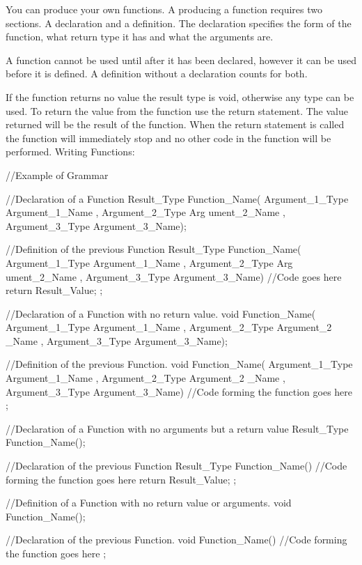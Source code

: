 You can produce your own functions. A producing a function requires two sections. A declaration and a definition. The declaration specifies the form of the function, what return type it has and what the arguments are. \par
 A function cannot be used until after it has been declared, however it can be used before it is defined. A definition without a declaration counts for both. \par
 If the function returns no value the result type is void, otherwise any type can be used. To return the value from the function use the return statement. The value returned will be the result of the function. When the return statement is called the function will immediately stop and no other code in the function will be performed. Writing Functions: 
\begin{DoxyCode}
 //Example of Grammar

 //Declaration of a Function
 Result_Type Function_Name( Argument_1_Type Argument_1_Name , Argument_2_Type Arg
      ument_2_Name , Argument_3_Type Argument_3_Name);

 //Definition of the previous Function
 Result_Type Function_Name( Argument_1_Type Argument_1_Name , Argument_2_Type Arg
      ument_2_Name , Argument_3_Type Argument_3_Name)
 {
 //Code goes here
 return Result_Value;
 };

 //Declaration of a Function with no return value.
 void Function_Name( Argument_1_Type Argument_1_Name , Argument_2_Type Argument_2
      _Name , Argument_3_Type Argument_3_Name);

 //Definition of the previous Function.
 void Function_Name( Argument_1_Type Argument_1_Name , Argument_2_Type Argument_2
      _Name , Argument_3_Type Argument_3_Name)
 {
 //Code forming the function goes here
 };

 //Declaration of a Function with no arguments but a return value
 Result_Type Function_Name();

 //Declaration of the previous Function
 Result_Type Function_Name()
 {
  //Code forming the function goes here
 return Result_Value;
 };

 //Definition of a Function with no return value or arguments.
 void Function_Name();

 //Declaration of the previous Function.
 void Function_Name()
 {
  //Code forming the function goes here
 };
\end{DoxyCode}


